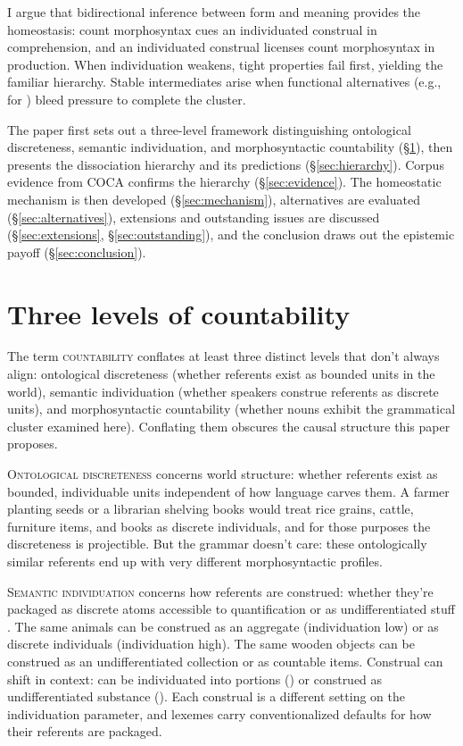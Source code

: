 \documentclass[12pt,a4paper]{article}
\begin{document}
I argue that bidirectional inference between form and meaning provides the homeostasis: count morphosyntax cues an individuated construal in comprehension, and an individuated construal licenses count morphosyntax in production. When individuation weakens, tight properties fail first, yielding the familiar hierarchy. Stable intermediates arise when functional alternatives (e.g.,  for ) bleed pressure to complete the cluster.

The paper first sets out a three-level framework distinguishing ontological discreteness, semantic individuation, and morphosyntactic countability (\S\ref{sec:levels}), then presents the dissociation hierarchy and its predictions (\S\ref{sec:hierarchy}). Corpus evidence from COCA confirms the hierarchy (\S\ref{sec:evidence}). The homeostatic mechanism is then developed (\S\ref{sec:mechanism}), alternatives are evaluated (\S\ref{sec:alternatives}), extensions and outstanding issues are discussed (\S\ref{sec:extensions}, \S\ref{sec:outstanding}), and the conclusion draws out the epistemic payoff (\S\ref{sec:conclusion}).

\section{Three levels of countability}\label{sec:levels}

The term \textsc{countability} conflates at least three distinct levels that don't always align: ontological discreteness (whether referents exist as bounded units in the world), semantic individuation (whether speakers construe referents as discrete units), and morphosyntactic countability (whether nouns exhibit the grammatical cluster examined here). Conflating them obscures the causal structure this paper proposes.

\textsc{Ontological discreteness} concerns world structure: whether referents exist as bounded, individuable units independent of how language carves them. A farmer planting seeds or a librarian shelving books would treat rice grains, cattle, furniture items, and books as discrete individuals, and for those purposes the discreteness is projectible. But the grammar doesn't care: these ontologically similar referents end up with very different morphosyntactic profiles.

\textsc{Semantic individuation} concerns how referents are construed: whether they're packaged as discrete atoms accessible to quantification or as undifferentiated stuff \citep{chierchia1998,rothstein2010,grimm2018}. The same animals can be construed as an aggregate (individuation low) or as discrete individuals (individuation high). The same wooden objects can be construed as an undifferentiated collection or as countable items. Construal can shift in context:  can be individuated into portions () or construed as undifferentiated substance (). Each construal is a different setting on the individuation parameter, and lexemes carry conventionalized defaults for how their referents are packaged.
\end{document}
